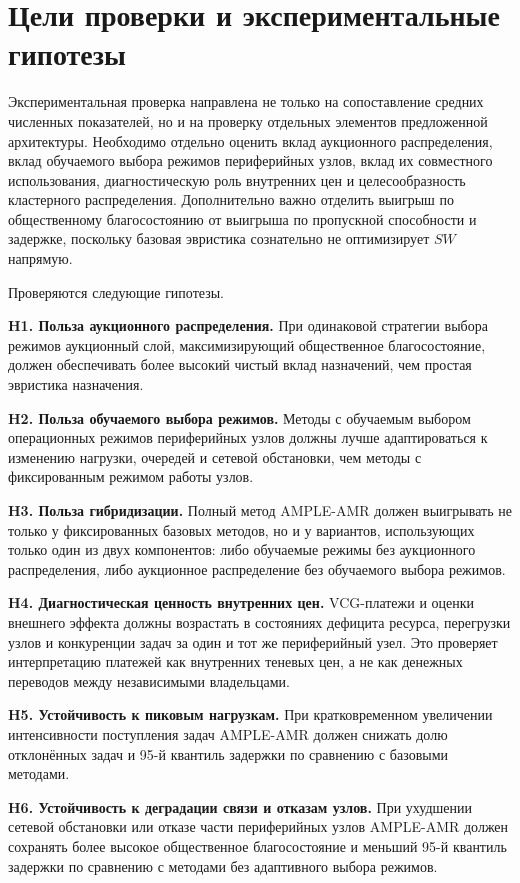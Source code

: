 \section{Цели проверки и экспериментальные гипотезы}

Экспериментальная проверка направлена не только на сопоставление средних численных показателей, но и на проверку отдельных элементов предложенной архитектуры. Необходимо отдельно оценить вклад аукционного распределения, вклад обучаемого выбора режимов периферийных узлов, вклад их совместного использования, диагностическую роль внутренних цен и целесообразность кластерного распределения. Дополнительно важно отделить выигрыш по общественному благосостоянию от выигрыша по пропускной способности и задержке, поскольку базовая эвристика сознательно не оптимизирует $SW$ напрямую.

Проверяются следующие гипотезы.

\textbf{H1. Польза аукционного распределения.} При одинаковой стратегии выбора режимов аукционный слой, максимизирующий общественное благосостояние, должен обеспечивать более высокий чистый вклад назначений, чем простая эвристика назначения.

\textbf{H2. Польза обучаемого выбора режимов.} Методы с обучаемым выбором операционных режимов периферийных узлов должны лучше адаптироваться к изменению нагрузки, очередей и сетевой обстановки, чем методы с фиксированным режимом работы узлов.

\textbf{H3. Польза гибридизации.} Полный метод AMPLE-AMR должен выигрывать не только у фиксированных базовых методов, но и у вариантов, использующих только один из двух компонентов: либо обучаемые режимы без аукционного распределения, либо аукционное распределение без обучаемого выбора режимов.

\textbf{H4. Диагностическая ценность внутренних цен.} VCG-платежи и оценки внешнего эффекта должны возрастать в состояниях дефицита ресурса, перегрузки узлов и конкуренции задач за один и тот же периферийный узел. Это проверяет интерпретацию платежей как внутренних теневых цен, а не как денежных переводов между независимыми владельцами.

\textbf{H5. Устойчивость к пиковым нагрузкам.} При кратковременном увеличении интенсивности поступления задач AMPLE-AMR должен снижать долю отклонённых задач и 95-й квантиль задержки по сравнению с базовыми методами.

\textbf{H6. Устойчивость к деградации связи и отказам узлов.} При ухудшении сетевой обстановки или отказе части периферийных узлов AMPLE-AMR должен сохранять более высокое общественное благосостояние и меньший 95-й квантиль задержки по сравнению с методами без адаптивного выбора режимов.

